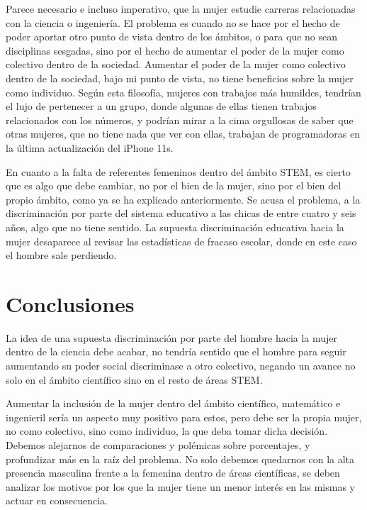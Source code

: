 Parece necesario e incluso imperativo, que la mujer estudie carreras relacionadas con la ciencia o ingeniería. El problema es 
cuando no se hace por el hecho de poder aportar otro punto de vista dentro de los ámbitos, o para que no sean disciplinas 
sesgadas, sino por el hecho de aumentar el poder de la mujer como colectivo dentro de la sociedad. Aumentar el poder de 
la mujer como colectivo dentro de la sociedad, bajo mi punto de vista, no tiene beneficios sobre la mujer como individuo. 
Según esta filosofía, mujeres con trabajos más humildes, tendrían el lujo de pertenecer a un grupo, donde algunas de 
ellas tienen trabajos relacionados con los números, y podrían mirar a la cima orgullosas de saber que otras mujeres, que
 no tiene nada que ver con ellas, trabajan de programadoras en la última actualización del iPhone 11s.

En cuanto a la falta de referentes femeninos dentro del ámbito STEM, es cierto que es algo que debe cambiar, no por el bien 
de la mujer, sino por el bien del propio ámbito, como ya se ha explicado anteriormente. Se acusa el problema, a la discriminación 
por parte del sistema educativo a las chicas de entre cuatro y seis años, algo que no tiene sentido. La supuesta discriminación 
educativa hacia la mujer desaparece al revisar las estadísticas de fracaso escolar, donde en este caso el hombre sale perdiendo.


\section{Conclusiones}
\label{sec:conclusiones}

La idea de una supuesta discriminación por parte del hombre hacia la mujer dentro de la ciencia debe acabar, no tendría 
sentido que el hombre para seguir aumentando su poder social discriminase a otro colectivo, negando un avance no solo 
en el ámbito científico sino en el resto de áreas STEM. 

Aumentar la inclusión de la mujer dentro del ámbito científico, matemático e ingenieril sería un aspecto muy positivo para 
estos, pero debe ser la propia mujer, no como colectivo, sino como individuo, la que deba tomar dicha decisión. Debemos 
alejarnos de comparaciones y polémicas sobre porcentajes, y profundizar más en la raíz del problema. No solo 
debemos quedarnos con la alta presencia masculina frente a la femenina dentro de áreas científicas, se deben analizar los 
motivos por los que la mujer tiene un menor interés en las mismas y actuar en consecuencia. \nocite{maldita}

          


